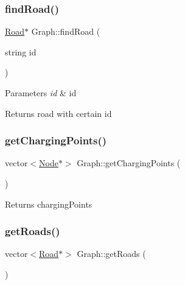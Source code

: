 \subsubsection{\texorpdfstring{find\+Road()}{findRoad()}}
{\footnotesize\ttfamily \mbox{\hyperlink{class_road}{Road}}$\ast$ Graph\+::find\+Road (\begin{DoxyParamCaption}\item[{string}]{id }\end{DoxyParamCaption})\hspace{0.3cm}{\ttfamily [inline]}}


\begin{DoxyParams}{Parameters}
{\em id} & id \\
\hline
\end{DoxyParams}
\begin{DoxyReturn}{Returns}
road with certain id 
\end{DoxyReturn}
\mbox{\label{class_graph_a22c9dd0bd46bff0107f8414980c28749}} 
\subsubsection{\texorpdfstring{get\+Charging\+Points()}{getChargingPoints()}}
{\footnotesize\ttfamily vector$<$\mbox{\hyperlink{class_node}{Node}}$\ast$$>$ Graph\+::get\+Charging\+Points (\begin{DoxyParamCaption}{ }\end{DoxyParamCaption})\hspace{0.3cm}{\ttfamily [inline]}}

\begin{DoxyReturn}{Returns}
charging\+Points 
\end{DoxyReturn}
\mbox{\label{class_graph_a95b76b429415815ffe5d14250452e313}} 
\subsubsection{\texorpdfstring{get\+Roads()}{getRoads()}}
{\footnotesize\ttfamily vector$<$\mbox{\hyperlink{class_road}{Road}}$\ast$$>$ Graph\+::get\+Roads (\begin{DoxyParamCaption}{ }\end{DoxyParamCaption})\hspace{0.3cm}{\ttfamily [inline]}}

